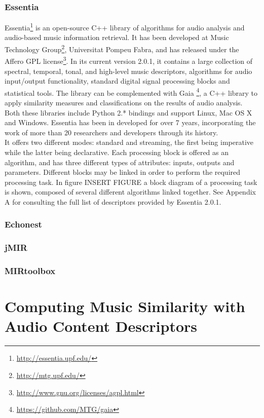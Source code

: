 \subsubsection*{Essentia}
Essentia\footnote{\url{http://essentia.upf.edu/}} is an open-source C++ library of algorithms for audio analysis and audio-based music information retrieval. It has been developed at Music Technology Group\footnote{\url{http://mtg.upf.edu/}}, Universitat Pompeu Fabra, and has released under the Affero GPL license\footnote{\url{http://www.gnu.org/licenses/agpl.html}}. In its current version 2.0.1, it contains a large collection of spectral, temporal, tonal, and high-level music descriptors, algorithms for audio input/output functionality, standard digital signal processing blocks and statistical tools. The library can be complemented with Gaia \footnote{\url{https://github.com/MTG/gaia}}, a C++ library to apply similarity measures and classifications on the results of audio analysis. Both these libraries include Python 2.* bindings and support Linux, Mac OS X and Windows. Essentia has been in developed for over 7 years, incorporating the work of more than 20 researchers and developers through its history. \\
It offers two different modes: standard and streaming, the first being imperative while the latter being declarative. Each processing block is offered as an algorithm, and has three different types of attributes: inputs, outputs and parameters. Different blocks may be linked in order to perform the required processing task. In figure INSERT FIGURE a block diagram of a processing task is shown, composed of several different algorithms linked together. See Appendix A for consulting the full list of descriptors provided by Essentia 2.0.1.

\subsubsection*{Echonest}
\subsubsection*{jMIR}
\subsubsection*{MIRtoolbox}

\section{Computing Music Similarity with Audio Content Descriptors}

